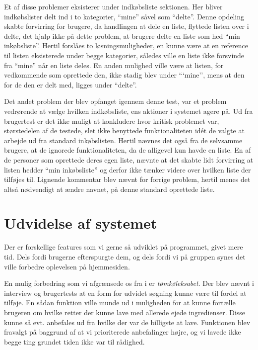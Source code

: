 Et af disse problemer eksisterer under indkøbsliste sektionen.
Her bliver indkøbslister delt ind i to kategorier, ``mine'' såvel som ``delte''.
Denne opdeling skabte forvirring for brugere, da handlingen at dele en liste, flyttede listen over i delte, det hjalp ikke på dette problem, at brugere delte en liste som hed ``min inkøbsliste''.
Hertil forslåes to løsningsmuligheder, en kunne være at en reference til listen eksisterede under begge kategorier, således ville en liste ikke forsvinde fra ``mine'' når en liste deles.
En anden mulighed ville være at listen, for vedkommende som oprettede den, ikke stadig blev under ```mine'', mens at den for de den er delt med, ligges under ``delte''.

Det andet problem der blev opfanget igennem denne test, var et problem vedrørende at vælge hvilken indkøbsliste, ens aktioner i systemet agere på.
Ud fra brugertest er det ikke muligt at konkludere hvor kritisk problemet var, størstedelen af de testede, slet ikke benyttede funktionaliteten idét de valgte at arbejde ud fra standard inkøbslisten.
Hertil nævnes det også fra de selvsamme brugere, at de ignorede funktionaliteten, da de alligevel kun havde en liste.
En af de personer som oprettede deres egen liste, nævnte at det skabte lidt forvirring at listen hedder ``min inkøbsliste'' og derfor ikke tænker videre over hvilken liste der tilføjes til.
Lignende kommentar blev nævnt for forrige problem, hertil menes det altså nødvendigt at ændre navnet, på denne standard oprettede liste.

\section{Udvidelse af systemet}\label{udvidelse}

Der er forskellige features som vi gerne så udviklet på programmet, givet mere tid. Dels fordi brugerne efterspurgte dem, og dels fordi vi på gruppen synes det ville forbedre oplevelsen på hjemmesiden.

En mulig forbedring som vi afgrænsede os fra i  er \textit{tømkøleksabet}.
Der blev nævnt i interview og brugertests at en form for udvidet søgning kunne være til fordel at tilføje.
En sådan funktion ville munde ud i muligheden for at kunne fortælle brugeren om hvilke retter der kunne lave med allerede ejede ingredienser.
Disse kunne så evt. anbefales ud fra hvilke der var de billigste at lave.
Funktionen blev fravalgt på baggrund af at vi prioriterede anbefalinger højre, og vi lavede ikke begge ting grundet tiden ikke var til rådighed.

